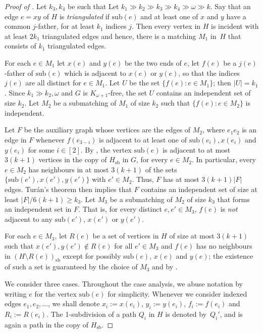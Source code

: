 \documentclass[11pt,english]{article}
\theoremstyle{plain}
\theoremstyle{definition}
\theoremstyle{remark}
\newcommand{\sub}{\mathrm{sub}}
\newcommand{\sbb}{\mathrm{sb}}
\newcommand{\triangulated}{triangulated}
\begin{document}
		\begin{proof}[Proof of ]
		    Let $k_3, k_4$ be such that 
			Let $k_1 \gg k_2 \gg k_3 \gg k_4 \gg \omega \gg k$.
			Say that an edge $e = xy$ of $H$ is \emph{triangulated} if $\sub(e)$ and at least one of $x$ and $y$ have a common $j$-father, for at least $k_1$ indices $j$.
			Then every vertex in $H$ is incident with at least $2k_1$ \triangulated{} edges and hence, there is a matching $M_1$ in~$H$ that consists of $k_1$ \triangulated{} edges.
			
			For each $e \in M_1$ let $x(e)$ and $y(e)$ be the two ends of $e$, let $f(e)$ be a $j(e)$-father of $\sub(e)$ which is adjacent to $x(e)$ or $y(e)$, so that the indices $j(e)$ are all distinct for $e \in M_1$. Let $U$ be the set $\{f(e) : e \in M_1\}$; then $|U|=k_1$. Since $k_1 \gg k_2, \omega$ and $G$ is $K_{\omega+1}$-free, the set $U$ contains an independent set of size $k_2$. Let $M_2$ be a submatching of $M_1$ of size $k_2$ such that $\{f(e) : e \in M_2\}$ is independent. 

			Let $F$ be the auxiliary graph whose vertices are the edges of $M_2$, where $e_1 e_2$ is an edge in $F$ whenever $f(e_{3-i})$ is adjacent to at least one of $\sub(e_i), x(e_i)$ and $y(e_i)$ for some $i \in [2]$. 
			By , the vertex $\sub(e)$ is adjacent to at most $3(k+1)$ vertices in the copy of $H_\sbb$ in $G$, for every $e \in M_2$. 
			In particular, every $e\in M_2$ has neighbours in at most $3(k+1)$ of the sets $\{\sub(e'), x(e'), y(e')\}$ with $e' \in M_2$.
			Thus, $F$ has at most $3(k+1) |F|$ edges. Tur\'an's theorem then implies that $F$ contains an independent set of size at least $|F|/6(k+1) \ge k_3$. Let $M_3$ be a submatching of $M_2$ of size $k_3$ that forms an independent set in $F$.
			That is, for every distinct $e, e'\in M_3$, $f(e)$ is \emph{not} adjacent to any $\sub(e')$, $x(e')$ or $y(e')$.

			For each $e \in M_3$, let $R(e)$ be a set of vertices in $H$ of size at most $3(k+1)$ such that $x(e'), y(e') \notin R(e)$ for all $e' \in M_3$ and $f(e)$ has no neighbours in $(H \setminus R(e))_\sbb$ except for possibly $\sub(e)$, $x(e)$ and $y(e)$; the existence of such a set is guaranteed by the choice of $M_3$ and by .

			We consider three cases. Throughout the case analysis, we abuse notation by writing $e$ for the vertex $\sub(e)$ for simplicity.
			Whenever we consider indexed edges $e_1,e_2,\ldots$, we shall denote $x_i := x(e_i)$, $y_i := y(e_i)$, $f_i := f(e_i)$ and $R_i := R(e_i)$.
			The 1-subdivision of a path $Q_i$ in $H$ is denoted by~$Q_i'$, and is again a path in the copy of $H_\sbb$.
			

\end{proof}
\end{document}
